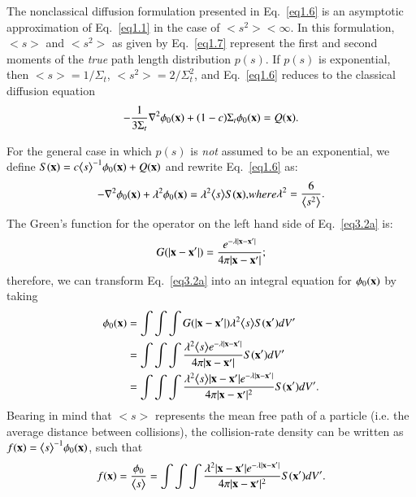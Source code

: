 \documentclass[preprint,12pt]{elsarticle}
\newcommand{\bl}{\big<}
\newcommand{\bg}{\big>}
\newcommand{\ux}{{\bf x}}
\begin{document}
The nonclassical diffusion formulation presented in Eq.\ \eqref{eq1.6} is an asymptotic approximation of Eq.\ \eqref{eq1.1} in the case of $\bl s^2\bg<\infty$. In this formulation, $\bl s \bg$ and $\bl s^2\bg$ as given by Eq.\ \eqref{eq1.7} represent the first and second moments of the \textit{true} path length distribution $p(s)$.
 If $p(s)$ is exponential, then $\bl s\bg = 1/\Sigma_t$, $\bl s^2\bg = 2/\Sigma_t^2$, and Eq.\ \eqref{eq1.6} reduces to the classical diffusion equation
\begin{equation}
\label{eq3.1}
-\frac{1}{3\Sigma_t} \nabla^2 \phi_0(\ux) + (1-c)\Sigma_t \phi_0(\ux) = Q(\ux).
\end{equation}

For the general case in which $p(s)$ is \textit{not} assumed to be an exponential, we define $S(\ux) = c\bl s\bg^{-1}\phi_0(\ux)+Q(\ux)$ and rewrite 
Eq.\ \eqref{eq1.6} as:
\begin{subequations}\label{eq3.2}
\begin{align}
-\nabla^2\phi_0(\ux) + \lambda^2 \phi_0(\ux) = \lambda^2 \bl s \bg S(\ux),\label{eq3.2a}
\end{align}
where
\begin{align}
\lambda^2=\frac{6}{\bl s^2 \bg}.
\end{align}
\end{subequations}
The Green's function for the operator on the left hand side of Eq.\ \eqref{eq3.2a} is:
\begin{equation}
\label{eq3.3}
G(|\ux-\ux'|) = \frac{e^{-\lambda |\ux-\ux'|}}{4\pi |\ux-\ux'|};
\end{equation}
therefore, we can transform Eq.\ \eqref{eq3.2a} into an integral equation for $\phi_0(\bf x)$ by taking
\begin{align}\label{eq3.4}
\phi_0(\ux) &= \int\int\int G(|\ux-\ux'|) \lambda^2\bl s \bg S(\ux') dV' \\
&= \int\int\int \frac{\lambda^2\bl s \bg e^{-\lambda |\ux-\ux'|}}{4\pi  |\ux-\ux'|} S(\ux') dV'  \nonumber \\
&= \int\int\int \frac{\lambda^2 \bl s \bg |\ux-\ux'| e^{-\lambda |\ux-\ux'|}}{4\pi |\ux-\ux'|^2} S(\ux') dV'.\nonumber
\end{align}
Bearing in mind that $\bl s\bg$ represents the mean free path of a particle (i.e. the average distance between collisions), the collision-rate density can be written as $f(\ux)=\bl s\bg^{-1} \phi_0(\ux)$, such that
\begin{equation}
\label{eq3.5}
f(\ux)=\frac{\phi_0}{\bl s \bg} = \int\int\int \frac{\lambda^2 |\ux-\ux'| e^{-\lambda |\ux-\ux'|}}{4\pi |\ux-\ux'|^2} S(\ux') dV'.
\end{equation}
\end{document}
